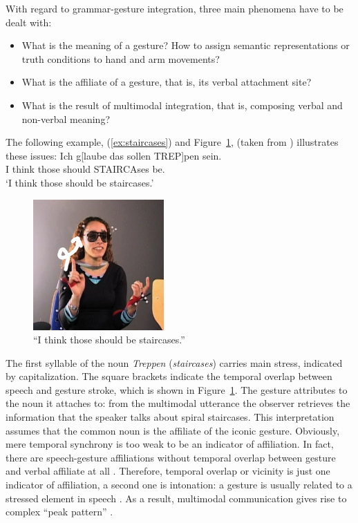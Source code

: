 \documentclass[output=paper]{langsci/langscibook}
\begin{document}
With regard to grammar-gesture integration, three main phenomena have to be dealt with:
%
\begin{itemize}
\item What is the meaning of a gesture? How to assign semantic representations or truth conditions to hand and arm movements? 
\item What is the affiliate of a gesture, that is, its verbal attachment site?  
\item What is the result of multimodal integration, that is, composing verbal and non-verbal meaning? 
\end{itemize}


The following example, (\ref{ex:staircases}) and Figure~\ref{fig:staircases}, (taken from \citet[]{Luecking:2013:a}) illustrates these issues:
%
\ea \label{ex:staircases}
\gll Ich g[laube das sollen TREP]pen sein.\\
     I think those should STAIRCAses be. \\
\glt \enquote*{I think those should be staircases.}
\z

\begin{figure}[tb]
  \includegraphics[width=5cm]{figures/treppen-2}
  \caption{\enquote{I think those should be staircases.}}
  \label{fig:staircases}
\end{figure}

The first syllable of the  noun \textit{Treppen} (\textit{staircases}) carries main stress, indicated by capitalization. 
%
The square brackets indicate the temporal overlap between speech and gesture stroke, which is shown in Figure~\ref{fig:staircases}.
%
The gesture attributes to the noun it attaches to: from the multimodal utterance the observer retrieves the information that the speaker talks about spiral staircases. 
%
This interpretation assumes that the common noun is the affiliate of the iconic gesture.
%
Obviously, mere temporal synchrony is too weak to be an indicator of affiliation.
%
In fact, there are speech-gesture affiliations without temporal overlap between gesture and verbal affiliate at all \citep[e.g.][]{Luecking:Rieser:Stegmann:2004}.
%
Therefore, temporal overlap or vicinity is just one indicator of affiliation, a second one is intonation: a gesture is usually related to a stressed element in speech \citep{McClave:1994,Nobe:2000,Loehr:2004,Loehr:2007}. 
%
As a result, multimodal communication gives rise to complex \enquote{peak pattern} \citep{Tuite:1993,Loehr:2004,Jannedy:Mendoza-Denton:2005}.
\end{document}
